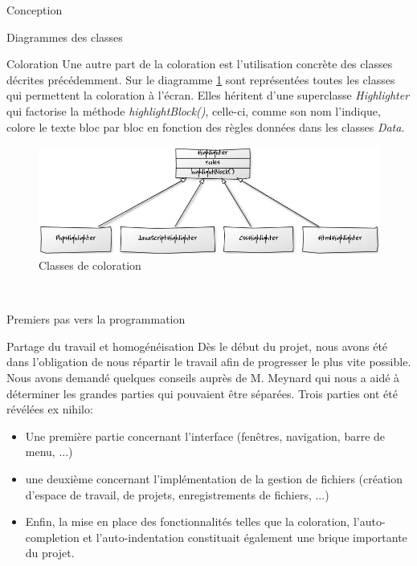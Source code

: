 \documentclass[a4paper, 12pt]{report}
\begin{document}
\begin{part}{Conception}
\begin{chapter}{Diagrammes des classes}
\begin{section}{Coloration}
				Une autre part de la coloration est l'utilisation concrète des classes décrites précédemment. Sur le diagramme \ref{bicyclette} sont
				représentées toutes les classes qui permettent la coloration à l'écran. Elles héritent d'une superclasse
				\emph{Highlighter} qui factorise la méthode \emph{highlightBlock()}, celle-ci, comme son nom l'indique, colore le texte bloc
				par bloc en fonction des règles données dans les classes \emph{Data}.
				\begin{figure}[ht]
					\begin{center}
						\includegraphics[width=14cm]{images/classesColoration.jpg}
						\caption{Classes de coloration}
						\label{bicyclette}
					\end{center}
				\end{figure}~\\
			\end{section}
		\end{chapter}
		\begin{chapter}{Premiers pas vers la programmation}
			\begin{section}{Partage du travail et homogénéisation}
				Dès le début du projet, nous avons été dans l'obligation de nous répartir le travail afin de progresser le plus vite possible.
				Nous avons demandé quelques conseils auprès de M. Meynard qui nous a aidé à déterminer les grandes parties qui pouvaient 
				être séparées. Trois parties ont été révélées ex nihilo:\\
				\begin{itemize}
					\item Une première partie concernant l'interface (fenêtres, navigation, barre de menu, ...)
					\item une deuxième concernant l'implémentation de la gestion de fichiers (création d'espace de travail, de projets,
					enregistrements de fichiers, ...)
					\item Enfin, la mise en place des fonctionnalités telles que la coloration, l'auto-completion et l'auto-indentation
					constituait également une brique importante du projet.
				\end{itemize}

\end{section}
\end{chapter}
\end{part}
\end{document}

